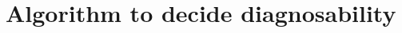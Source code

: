 \documentclass[a4paper, 10pt, conference]{ieeeconf}
\begin{document}
% 
% 
% 



\section{Algorithm to decide diagnosability}
\label{sec:Algorithm}
\end{document}
